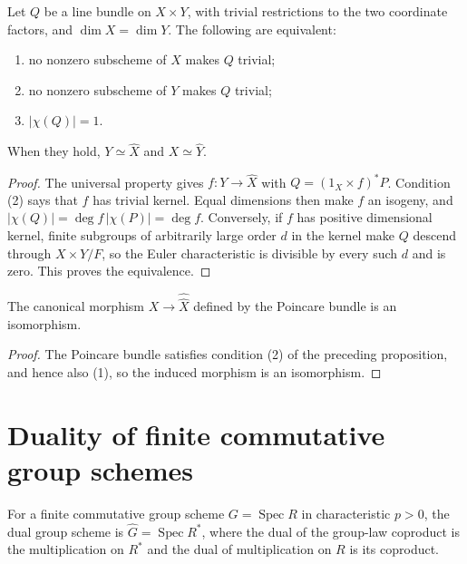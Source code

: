 \begin{proposition}
\label{mumford-prop-divisorial-correspondence}
Let $Q$ be a line bundle on $X\times Y$, with trivial restrictions to the
two coordinate factors, and $\dim X=\dim Y$. The following are equivalent:
\begin{enumerate}
\item no nonzero subscheme of $X$ makes $Q$ trivial;
\item no nonzero subscheme of $Y$ makes $Q$ trivial;
\item $|\chi(Q)|=1$.
\end{enumerate}
When they hold, $Y\simeq\widehat X$ and $X\simeq\widehat Y$.
\end{proposition}
\begin{proof}
The universal property gives $f:Y\to\widehat X$ with
$Q=(1_X\times f)^*P$. Condition (2) says that $f$ has trivial kernel. Equal
dimensions then make $f$ an isogeny, and
$|\chi(Q)|=\deg f\,|\chi(P)|=\deg f$. Conversely, if $f$ has positive
dimensional kernel, finite subgroups of arbitrarily large order $d$ in the
kernel make $Q$ descend through $X\times Y/F$, so the Euler characteristic
is divisible by every such $d$ and is zero. This proves the equivalence.
\end{proof}

\begin{corollary}
\label{mumford-thm-duality-hypothesis}
\label{mumford-prop-biduality-any-characteristic}
The canonical morphism $X\to\widehat{\widehat X}$ defined by the Poincare
bundle is an isomorphism.
\end{corollary}
\begin{proof}
The Poincare bundle satisfies condition (2) of the preceding proposition,
and hence also (1), so the induced morphism is an isomorphism.
\end{proof}

\section{Duality of finite commutative group schemes}
\label{mumford-III14-source}

\begin{definition}
\label{mumford-def-cartier-dual}
For a finite commutative group scheme $G=\operatorname{Spec}R$ in
characteristic $p>0$, the dual group scheme is
$\widehat G=\operatorname{Spec}R^*$, where the dual of the group-law
coproduct is the multiplication on $R^*$ and the dual of multiplication on
$R$ is its coproduct.
\end{definition}

